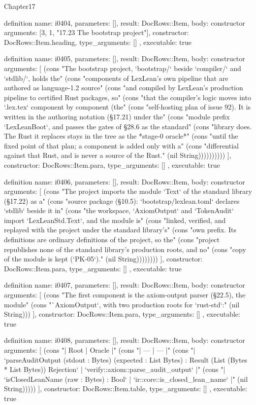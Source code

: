 \begin{lexlean}{Chapter17}
\begin{semanticmodule}
definition{
  name: i0404,
  parameters: [],
  result: DocRows::Item,
  body: constructor{
    arguments: [3, 1, "17.23 The bootstrap project"],
    constructor: DocRows::Item.heading,
    type_arguments: []
  },
  executable: true
}

definition{
  name: i0405,
  parameters: [],
  result: DocRows::Item,
  body: constructor{
    arguments: [
      (cons "The bootstrap project, `bootstrap/` beside `compiler/` and `stdlib/`, holds the" (cons "components of LexLean's own pipeline that are authored as language-1.2 source" (cons "and compiled by LexLean's production pipeline to certified Rust packages, so" (cons "that the compiler's logic moves into `.lex.tex` component by component (the" (cons "self-hosting plan of issue 92). It is written in the authoring notation (§17.21) under the" (cons "module prefix `LexLeanBoot`, and passes the gates of §28.6 as the standard" (cons "library does. The Rust it replaces stays in the tree as the *stage-0 oracle*" (cons "until the fixed point of that plan; a component is added only with a" (cons "differential against that Rust, and is never a source of the Rust." (nil String))))))))))
    ],
    constructor: DocRows::Item.para,
    type_arguments: []
  },
  executable: true
}

definition{
  name: i0406,
  parameters: [],
  result: DocRows::Item,
  body: constructor{
    arguments: [
      (cons "The project imports the module `Text` of the standard library (§17.22) as a" (cons "source package (§10.5): `bootstrap/lexlean.toml` declares `stdlib` beside it in" (cons "the workspace, `AxiomOutput` and `TokenAudit` import `LexLeanStd.Text`, and the module is" (cons "linked, verified, and replayed with the project under the standard library's" (cons "own prefix. Its definitions are ordinary definitions of the project, so the" (cons "project republishes none of the standard library's production roots, and no" (cons "copy of the module is kept (`PK-05`)." (nil String))))))))
    ],
    constructor: DocRows::Item.para,
    type_arguments: []
  },
  executable: true
}

definition{
  name: i0407,
  parameters: [],
  result: DocRows::Item,
  body: constructor{
    arguments: [
      (cons "The first component is the axiom-output parser (§22.5), the module" (cons "`AxiomOutput`, with two production roots for `rust-std`:" (nil String)))
    ],
    constructor: DocRows::Item.para,
    type_arguments: []
  },
  executable: true
}

definition{
  name: i0408,
  parameters: [],
  result: DocRows::Item,
  body: constructor{
    arguments: [
      (cons "| Root | Oracle |" (cons "| --- | --- |" (cons "| `parseAuditOutput (stdout : Bytes) (expected : List Bytes) : Result (List (Bytes * List Bytes)) Rejection` | `verify::axiom::parse_audit_output` |" (cons "| `isClosedLeanName (raw : Bytes) : Bool` | `ir::core::is_closed_lean_name` |" (nil String)))))
    ],
    constructor: DocRows::Item.table,
    type_arguments: []
  },
  executable: true
}


\end{semanticmodule}
\end{lexlean}
